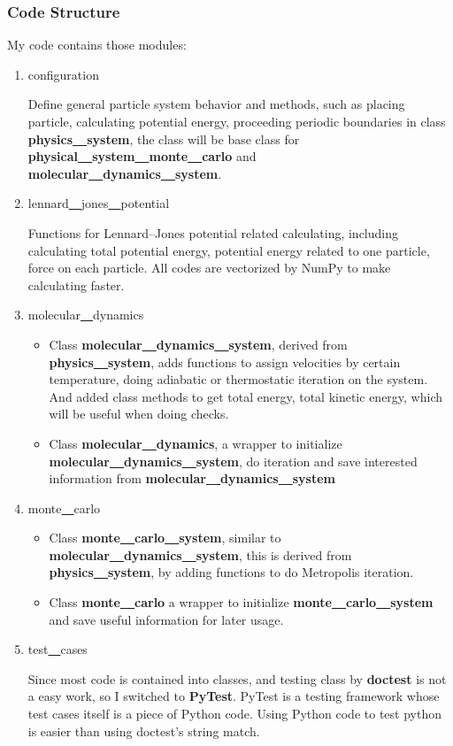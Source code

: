 \documentclass[UTF8,a4paper,no-math]{article}
\begin{document}
\subsubsection{Code Structure}
My code contains those modules:
\begin{enumerate}
	\item configuration

	      Define general particle system behavior and methods, such as placing particle, calculating potential energy, proceeding periodic boundaries in class \textbf{physics\underline{~~}system}, the class will be base class for
	      \textbf{physical\underline{~~}system\underline{~~}monte\underline{~~}carlo} and \textbf{molecular\underline{~~}dynamics\underline{~~}system}.
	\item lennard\underline{~~}jones\underline{~~}potential

	      Functions for Lennard–Jones potential related calculating, including calculating total potential energy, potential energy related to one particle, force on each particle. All codes are vectorized by NumPy to make calculating
	      faster.
	\item molecular\underline{~~}dynamics

	      \begin{itemize}
		      \item Class \textbf{molecular\underline{~~}dynamics\underline{~~}system}, derived from \textbf{physics\underline{~~}system}, adds functions to assign velocities by certain temperature, doing adiabatic or thermostatic iteration
		            on the system. And added class methods to get total energy, total kinetic energy, which will be useful when doing checks.
		      \item Class \textbf{molecular\underline{~~}dynamics}, a wrapper to initialize \textbf{molecular\underline{~~}dynamics\underline{~~}system}, do iteration and save interested information from \textbf{molecular\underline{~~}dynamics\underline{~~}system}
	      \end{itemize}
	\item monte\underline{~~}carlo

	      \begin{itemize}
		      \item Class \textbf{monte\underline{~~}carlo\underline{~~}system}, similar to \textbf{molecular\underline{~~}dynamics\underline{~~}system}, this is derived from \textbf{physics\underline{~~}system}, by adding functions to do Metropolis
		            iteration.
		      \item Class \textbf{monte\underline{~~}carlo} a wrapper to initialize \textbf{monte\underline{~~}carlo\underline{~~}system} and save useful information for later usage.
	      \end{itemize}
	\item test\underline{~~}cases

	      Since most code is contained into classes, and testing class by \textbf{doctest} is not a easy work, so I switched to \textbf{PyTest}. PyTest is a testing framework whose test cases itself is a piece of Python code. Using Python code to test python is
	      easier than using doctest's string match.
\end{enumerate}
\end{document}
